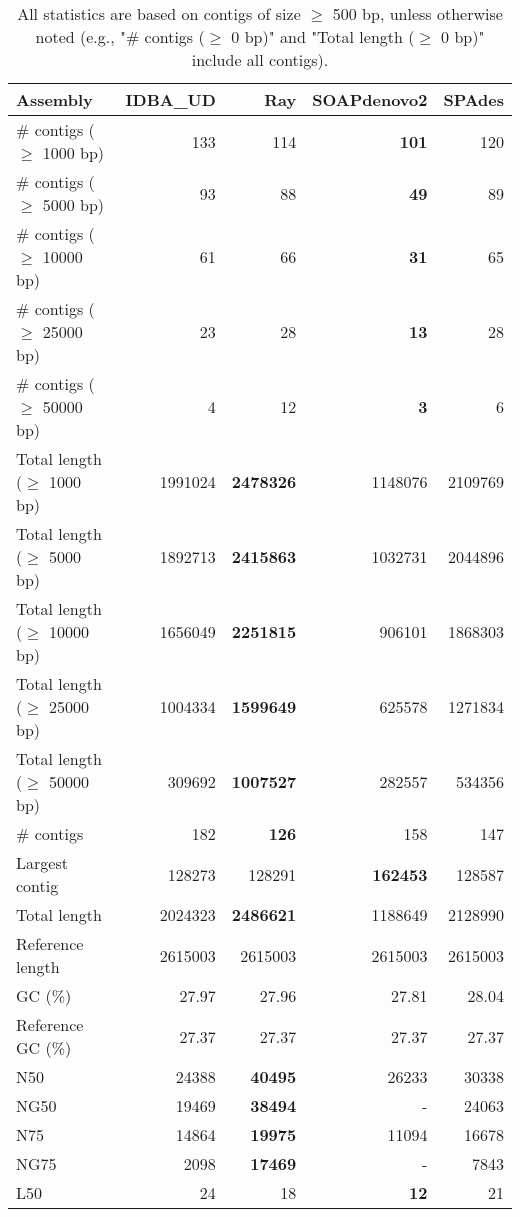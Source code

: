 \documentclass[12pt,a4paper]{article}
\begin{document}
\begin{table}[ht]
\begin{center}
\caption{All statistics are based on contigs of size $\geq$ 500 bp, unless otherwise noted (e.g., "\# contigs ($\geq$ 0 bp)" and "Total length ($\geq$ 0 bp)" include all contigs).}
\begin{tabular}{|l*{4}{|r}|}
\hline
Assembly & IDBA\_UD & Ray & SOAPdenovo2 & SPAdes \\ \hline
\# contigs ($\geq$ 1000 bp) & 133 & 114 & {\bf 101} & 120 \\ \hline
\# contigs ($\geq$ 5000 bp) & 93 & 88 & {\bf 49} & 89 \\ \hline
\# contigs ($\geq$ 10000 bp) & 61 & 66 & {\bf 31} & 65 \\ \hline
\# contigs ($\geq$ 25000 bp) & 23 & 28 & {\bf 13} & 28 \\ \hline
\# contigs ($\geq$ 50000 bp) & 4 & 12 & {\bf 3} & 6 \\ \hline
Total length ($\geq$ 1000 bp) & 1991024 & {\bf 2478326} & 1148076 & 2109769 \\ \hline
Total length ($\geq$ 5000 bp) & 1892713 & {\bf 2415863} & 1032731 & 2044896 \\ \hline
Total length ($\geq$ 10000 bp) & 1656049 & {\bf 2251815} & 906101 & 1868303 \\ \hline
Total length ($\geq$ 25000 bp) & 1004334 & {\bf 1599649} & 625578 & 1271834 \\ \hline
Total length ($\geq$ 50000 bp) & 309692 & {\bf 1007527} & 282557 & 534356 \\ \hline
\# contigs & 182 & {\bf 126} & 158 & 147 \\ \hline
Largest contig & 128273 & 128291 & {\bf 162453} & 128587 \\ \hline
Total length & 2024323 & {\bf 2486621} & 1188649 & 2128990 \\ \hline
Reference length & 2615003 & 2615003 & 2615003 & 2615003 \\ \hline
GC (\%) & 27.97 & 27.96 & 27.81 & 28.04 \\ \hline
Reference GC (\%) & 27.37 & 27.37 & 27.37 & 27.37 \\ \hline
N50 & 24388 & {\bf 40495} & 26233 & 30338 \\ \hline
NG50 & 19469 & {\bf 38494} & - & 24063 \\ \hline
N75 & 14864 & {\bf 19975} & 11094 & 16678 \\ \hline
NG75 & 2098 & {\bf 17469} & - & 7843 \\ \hline
L50 & 24 & 18 & {\bf 12} & 21 \\ \hline

\end{tabular}
\end{center}
\end{table}
\end{document}
